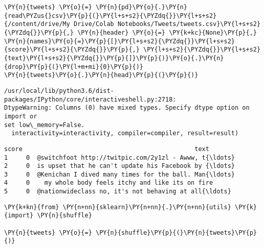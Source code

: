     \begin{tcolorbox}[breakable, size=fbox, boxrule=1pt, pad at break*=1mm,colback=cellbackground, colframe=cellborder]
\begin{Verbatim}[commandchars=\\\{\}]
\PY{n}{tweets} \PY{o}{=} \PY{n}{pd}\PY{o}{.}\PY{n}{read\PYZus{}csv}\PY{p}{(}\PY{l+s+s2}{\PYZdq{}}\PY{l+s+s2}{/content/drive/My Drive/Colab Notebooks/Tweets/tweets.csv}\PY{l+s+s2}{\PYZdq{}}\PY{p}{,} \PY{n}{header} \PY{o}{=} \PY{k+kc}{None}\PY{p}{,} \PY{n}{names}\PY{o}{=}\PY{p}{[}\PY{l+s+s2}{\PYZdq{}}\PY{l+s+s2}{score}\PY{l+s+s2}{\PYZdq{}}\PY{p}{,} \PY{l+s+s2}{\PYZdq{}}\PY{l+s+s2}{text}\PY{l+s+s2}{\PYZdq{}}\PY{p}{]}\PY{p}{)}\PY{o}{.}\PY{n}{drop}\PY{p}{(}\PY{l+m+mi}{0}\PY{p}{)}
\PY{n}{tweets}\PY{o}{.}\PY{n}{head}\PY{p}{(}\PY{p}{)}
\end{Verbatim}
\end{tcolorbox}

    \begin{Verbatim}[commandchars=\\\{\}]
/usr/local/lib/python3.6/dist-packages/IPython/core/interactiveshell.py:2718:
DtypeWarning: Columns (0) have mixed types. Specify dtype option on import or
set low\_memory=False.
  interactivity=interactivity, compiler=compiler, result=result)
    \end{Verbatim}

            \begin{tcolorbox}[breakable, size=fbox, boxrule=.5pt, pad at break*=1mm, opacityfill=0]
\begin{Verbatim}[commandchars=\\\{\}]
  score                                               text
1     0  @switchfoot http://twitpic.com/2y1zl - Awww, t{\ldots}
2     0  is upset that he can't update his Facebook by {\ldots}
3     0  @Kenichan I dived many times for the ball. Man{\ldots}
4     0    my whole body feels itchy and like its on fire
5     0  @nationwideclass no, it's not behaving at all{\ldots}
\end{Verbatim}
\end{tcolorbox}
        
    \begin{tcolorbox}[breakable, size=fbox, boxrule=1pt, pad at break*=1mm,colback=cellbackground, colframe=cellborder]
\begin{Verbatim}[commandchars=\\\{\}]
\PY{k+kn}{from} \PY{n+nn}{sklearn}\PY{n+nn}{.}\PY{n+nn}{utils} \PY{k}{import} \PY{n}{shuffle}

\PY{n}{tweets} \PY{o}{=} \PY{n}{shuffle}\PY{p}{(}\PY{n}{tweets}\PY{p}{)}
\end{Verbatim}
\end{tcolorbox}

